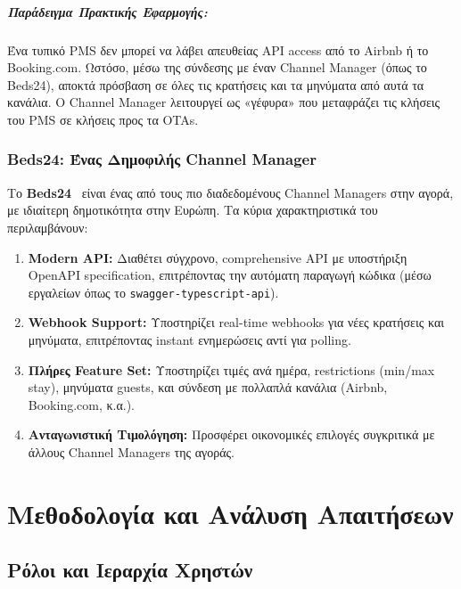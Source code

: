 \documentclass[
	12pt, %
	oneside, %
	greek,
	onehalfspacing, %
	liststotoc, %
	toctotoc, %
	parskip, %
	headsepline, %
]{MastersDoctoralThesis} %
\newcommand{\code}[1]{\texttt{#1}}
\begin{document}
\paragraph{Παράδειγμα Πρακτικής Εφαρμογής:}
Ένα τυπικό PMS δεν μπορεί να λάβει απευθείας API access από το Airbnb ή το Booking.com. Ωστόσο, μέσω της σύνδεσης με έναν Channel Manager (όπως το Beds24), αποκτά πρόσβαση σε όλες τις κρατήσεις και τα μηνύματα από αυτά τα κανάλια. Ο Channel Manager λειτουργεί ως «γέφυρα» που μεταφράζει τις κλήσεις του PMS σε κλήσεις προς τα OTAs.

\subsection{Beds24: Ένας Δημοφιλής Channel Manager}
\label{subsec:beds24}

Το \textbf{Beds24}~\cite{beds24api} είναι ένας από τους πιο διαδεδομένους Channel Managers στην αγορά, με ιδιαίτερη δημοτικότητα στην Ευρώπη. Τα κύρια χαρακτηριστικά του περιλαμβάνουν:

\begin{enumerate}
    \item \textbf{Modern API:} Διαθέτει σύγχρονο, comprehensive API με υποστήριξη OpenAPI specification, επιτρέποντας την αυτόματη παραγωγή κώδικα (μέσω εργαλείων όπως το \code{swagger-typescript-api}).
    \item \textbf{Webhook Support:} Υποστηρίζει real-time webhooks για νέες κρατήσεις και μηνύματα, επιτρέποντας instant ενημερώσεις αντί για polling.
    \item \textbf{Πλήρες Feature Set:} Υποστηρίζει τιμές ανά ημέρα, restrictions (min/max stay), μηνύματα guests, και σύνδεση με πολλαπλά κανάλια (Airbnb, Booking.com, κ.α.).
    \item \textbf{Ανταγωνιστική Τιμολόγηση:} Προσφέρει οικονομικές επιλογές συγκριτικά με άλλους Channel Managers της αγοράς.
\end{enumerate}


\chapter{Μεθοδολογία και Ανάλυση Απαιτήσεων}
\label{chap:methodology}

\section{Ρόλοι και Ιεραρχία Χρηστών}
\label{sec:user-hierarchy}
\end{document}
